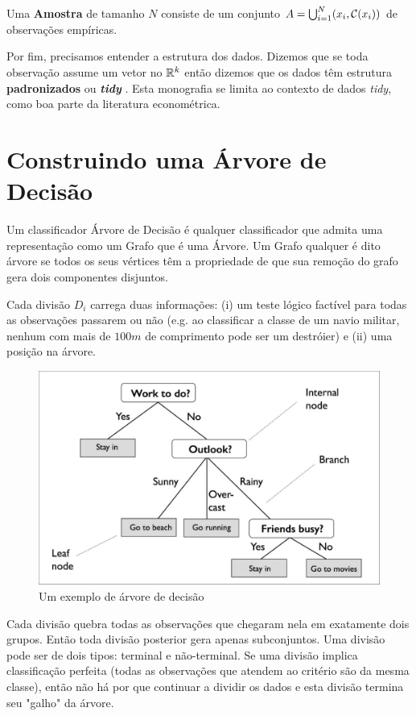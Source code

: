 \begin{defi}
Uma \textbf{Amostra} de tamanho $N$ consiste de um conjunto $ A = \bigcup_{i=1}^N (x_i, \mathcal{C}(x_i))$ de observações empíricas.
\end{defi}

Por fim, precisamos entender a estrutura dos dados. Dizemos que se toda observação assume um vetor no $\mathbb{R}^k$ então dizemos que os dados têm estrutura \textbf{padronizados} ou \textbf{\textit{tidy}} \cite{tidyr}. Esta monografia se limita ao contexto de dados \textit{tidy}, como boa parte da literatura econométrica.

\section{Construindo uma Árvore de Decisão}

Um classificador Árvore de Decisão é qualquer classificador que admita uma representação como um Grafo que é uma Árvore. Um Grafo qualquer é dito árvore se todos os seus vértices têm a propriedade de que sua remoção do grafo gera dois componentes disjuntos.

Cada divisão $D_i$ carrega duas informações: (i) um teste lógico factível para todas as observações passarem ou não (e.g. ao classificar a classe de um navio militar, nenhum com mais de $100m$ de comprimento pode ser um destróier) e (ii) uma posição na árvore.

\begin{figure}
    \centering
    \includegraphics[scale = .25]{imagens/arvore.png}
    \caption{Um exemplo de árvore de decisão}
    \label{fig:arvore}
\end{figure}

Cada divisão quebra todas as observações que chegaram nela em exatamente dois grupos. Então toda divisão posterior gera apenas subconjuntos. Uma divisão pode ser de dois tipos: terminal e não-terminal. Se uma divisão implica classificação perfeita (todas as observações que atendem ao critério são da mesma classe), então não há por que continuar a dividir os dados e esta divisão termina seu "galho" da árvore. 

